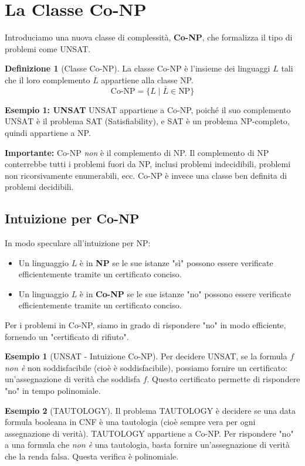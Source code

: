 \documentclass[a4paper]{article}
\theoremstyle{definition} %
\newtheorem{definition}{Definizione}
\newtheorem{example}{Esempio}
\begin{document}
\section{La Classe Co-NP}

Introduciamo una nuova classe di complessità, \textbf{Co-NP}, che formalizza il tipo di problemi come UNSAT.

\begin{definition}[Classe Co-NP]
La classe Co-NP è l'insieme dei linguaggi $L$ tali che il loro complemento $\overline{L}$ appartiene alla classe NP.
\[
\text{Co-NP} = \{ L \mid \overline{L} \in \text{NP} \}
\]
\end{definition}

\textbf{Esempio 1: UNSAT}
UNSAT appartiene a Co-NP, poiché il suo complemento $\overline{\text{UNSAT}}$ è il problema SAT (Satisfiability), e SAT è un problema NP-completo, quindi appartiene a NP.

\textbf{Importante:} Co-NP \textit{non} è il complemento di NP. Il complemento di NP conterrebbe tutti i problemi fuori da NP, inclusi problemi indecidibili, problemi non ricorsivamente enumerabili, ecc. Co-NP è invece una classe ben definita di problemi decidibili.

\subsection{Intuizione per Co-NP}
In modo speculare all'intuizione per NP:
\begin{itemize}
    \item Un linguaggio $L$ è in \textbf{NP} se le sue istanze "sì" possono essere verificate efficientemente tramite un certificato conciso.
    \item Un linguaggio $L$ è in \textbf{Co-NP} se le sue istanze "no" possono essere verificate efficientemente tramite un certificato conciso.
\end{itemize}
Per i problemi in Co-NP, siamo in grado di rispondere "no" in modo efficiente, fornendo un "certificato di rifiuto".

\begin{example}[UNSAT - Intuizione Co-NP]
Per decidere UNSAT, se la formula $f$ \textit{non è} non soddisfacibile (cioè è soddisfacibile), possiamo fornire un certificato: un'assegnazione di verità che soddisfa $f$. Questo certificato permette di rispondere "no" in tempo polinomiale.
\end{example}

\begin{example}[TAUTOLOGY]
Il problema TAUTOLOGY è decidere se una data formula booleana in CNF è una tautologia (cioè sempre vera per ogni assegnazione di verità).
TAUTOLOGY appartiene a Co-NP. Per rispondere "no" a una formula che \textit{non è} una tautologia, basta fornire un'assegnazione di verità che la renda falsa. Questa verifica è polinomiale.
\end{example}
\end{document}
